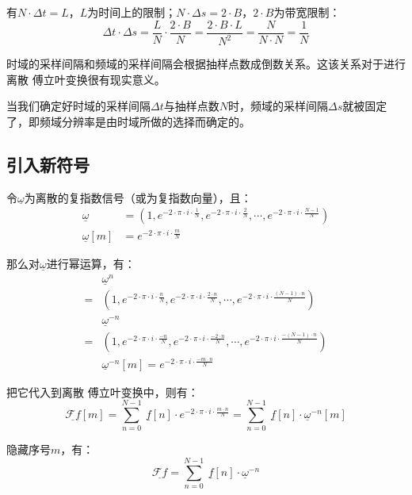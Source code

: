 有$N\cdot\Delta t=L$，$L$为时间上的限制；$N\cdot \Delta s=2\cdot B$，$2\cdot B$为带宽限制：
$$
	\Delta t\cdot \Delta s=\frac{L}{N}\cdot \frac{2\cdot B}{N}=\frac{2\cdot B\cdot L}{N^2}=\frac{N}{N\cdot N}=\frac{1}{N}
$$

时域的采样间隔和频域的采样间隔会根据抽样点数成倒数关系。这该关系对于进行离散 傅立叶变换很有现实意义。

当我们确定好时域的采样间隔$\Delta t$与抽样点数$N$时，频域的采样间隔$\Delta s$就被固定了，即频域分辨率是由时域所做的选择而确定的。
\subsection{引入新符号}

令$\underline{\omega}$为离散的复指数信号（或为复指数向量），且：
\begin{align*}
	\underline{\omega}    & =(1,e^{-2\cdot \pi\cdot i\cdot\frac{1}{N}},e^{-2\cdot \pi\cdot i\cdot\frac{2}{N}},\cdots,e^{-2\cdot \pi\cdot i\cdot\frac{N-1}{N}}) \\
	\underline{\omega}[m] & =e^{-2\cdot \pi\cdot i\cdot\frac{m}{N}}
\end{align*}

那么对$\underline{\omega}$进行幂运算，有：
\begin{align*}
	  & \underline{\omega}^n                                                                                                                                 \\
	= & (1,e^{-2\cdot \pi\cdot i\cdot\frac{n}{N}},e^{-2\cdot \pi\cdot i\cdot\frac{2\cdot n}{N}},\cdots,e^{-2\cdot \pi\cdot i\cdot\frac{(N-1)\cdot n}{N}})    \\
	  & \underline{\omega}^{-n}                                                                                                                              \\
	= & (1,e^{-2\cdot \pi\cdot i\cdot\frac{-n}{N}},e^{-2\cdot \pi\cdot i\cdot\frac{-2\cdot n}{N}},\cdots,e^{-2\cdot \pi\cdot i\cdot\frac{-(N-1)\cdot n}{N}}) \\
	  & \underline{\omega}^{-n}[m] =  e^{-2\cdot \pi\cdot i\cdot\frac{-m\cdot n}{N}}
\end{align*}

把它代入到离散 傅立叶变换中，则有：
$$
	\underline{\mathcal{F}f}[m]=\sum\limits_{n=0}^{N-1}\ \underline{f}[n]\cdot e^{-2\cdot \pi\cdot i\cdot\frac{m\cdot n}{N}}=\sum\limits_{n=0}^{N-1}\ \underline{f}[n]\cdot \underline{\omega}^{-n}[m]
$$

隐藏序号$m$，有：
\begin{equation}
	\underline{\mathcal{F}f}=\sum\limits_{n=0}^{N-1}\ \underline{f}[n]\cdot \underline{\omega}^{-n}
\end{equation}
